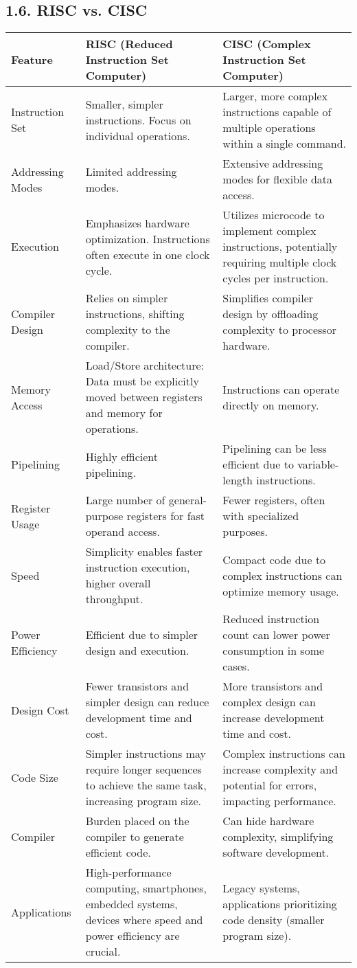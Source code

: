 \documentclass[
]{article}
\begin{document}
\hypertarget{16-risc-vs-cisc}{%
\subsection{1.6. RISC vs. CISC}\label{16-risc-vs-cisc}}

\begin{longtable}[]{@{}lll@{}}
\toprule
Feature & RISC (Reduced Instruction Set Computer) & CISC (Complex
Instruction Set Computer) \\
\midrule
\endhead
Instruction Set & Smaller, simpler instructions. Focus on individual
operations. & Larger, more complex instructions capable of multiple
operations within a single command. \\
Addressing Modes & Limited addressing modes. & Extensive addressing
modes for flexible data access. \\
Execution & Emphasizes hardware optimization. Instructions often execute
in one clock cycle. & Utilizes microcode to implement complex
instructions, potentially requiring multiple clock cycles per
instruction. \\
Compiler Design & Relies on simpler instructions, shifting complexity to
the compiler. & Simplifies compiler design by offloading complexity to
processor hardware. \\
Memory Access & Load/Store architecture: Data must be explicitly moved
between registers and memory for operations. & Instructions can operate
directly on memory. \\
Pipelining & Highly efficient pipelining. & Pipelining can be less
efficient due to variable-length instructions. \\
Register Usage & Large number of general-purpose registers for fast
operand access. & Fewer registers, often with specialized purposes. \\
Speed & Simplicity enables faster instruction execution, higher overall
throughput. & Compact code due to complex instructions can optimize
memory usage. \\
Power Efficiency & Efficient due to simpler design and execution. &
Reduced instruction count can lower power consumption in some cases. \\
Design Cost & Fewer transistors and simpler design can reduce
development time and cost. & More transistors and complex design can
increase development time and cost. \\
Code Size & Simpler instructions may require longer sequences to achieve
the same task, increasing program size. & Complex instructions can
increase complexity and potential for errors, impacting performance. \\
Compiler & Burden placed on the compiler to generate efficient code. &
Can hide hardware complexity, simplifying software development. \\
Applications & High-performance computing, smartphones, embedded
systems, devices where speed and power efficiency are crucial. & Legacy
systems, applications prioritizing code density (smaller program
size). \\
\bottomrule
\end{longtable}
\end{document}
